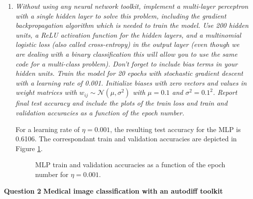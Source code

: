 \documentclass[12pt]{article}
\begin{document}
\begin{enumerate}[leftmargin=\labelsep]
\begin{enumerate}[label=\alph*)]
              \item \textit{Without using any neural network toolkit, implement a multi-layer
                    perceptron with a single hidden layer to solve this problem, including the gradient
                    backpropagation algorithm which is needed to train the model. Use 200 hidden units,
                    a ReLU activation function for the hidden layers, and a multinomial logistic loss (also
                    called cross-entropy) in the output layer (even though we are dealing with a binary
                    classification this will allow you to use the same code for a multi-class problem). Don’t
                    forget to include bias terms in your hidden units. Train the model for 20 epochs with
                    stochastic gradient descent with a learning rate of 0.001. Initialize biases with zero
                    vectors and values in weight matrices with $w_{ij} \sim \mathcal{N}(\mu, \sigma^2)$ with $\mu = 0.1$ and $\sigma^2 = {0.1}^2$. Report final test accuracy and include the plots of the train loss and train and validation
                    accuracies as a function of the epoch number.
                    }

                    \vspace{12pt}

                    For a learning rate of $\eta = 0.001$, the resulting test accuracy for the MLP is 0.6106. The correspondant train and validation accuracies are depicted in Figure \ref{fig:mlp-20-0.001}.

                    \begin{figure}[H]
                        \centering
                        
                        \caption{MLP train and validation accuracies as a function of the epoch number for $\eta = 0.001$.}
                        \label{fig:mlp-20-0.001}
                    \end{figure}

                    \vspace{12pt}

          \end{enumerate}

\end{enumerate}

\vspace{12pt}

\center\large{\textbf{Question 2}}
\center\textbf{Medical image classification with an autodiff toolkit}
\end{document}
